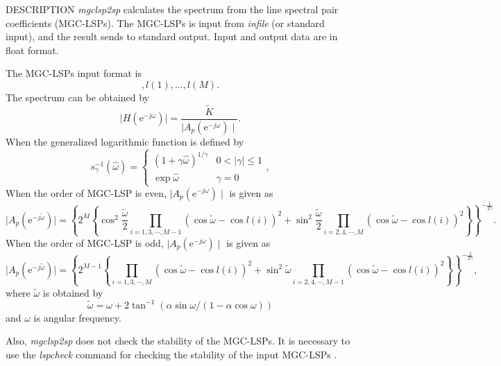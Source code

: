 \begin{synopsis}
\item [mgclsp2sp] [ --a $A$ ] [ --g $G$ ] [ --m $M$ ] [ --l $L$] [ --q $Q$ ] 
 [ --s $S$ ] [ --o $O$] \newline [ --k ] [ --L ] [ {\em infile} ]
\end{synopsis}

\begin{qsection}{DESCRIPTION}
{\em mgclsp2sp} calculates the spectrum from the line spectral pair coefficients (MGC-LSPs).
The MGC-LSPs is input from {\em infile} (or standard input), and the result sends to standard output.
Input and output data are in float format.

The MGC-LSPs input format is
\begin{displaymath}
 [ \tilde{K} ], l(1), \dots, l(M).
\end{displaymath}
The spectrum can be obtained by
\begin{displaymath}
 \mid H(\mathrm{e}^{-j\omega}) \mid = \frac{\tilde{K}}{\mid A_p(\mathrm{e}^{-j\omega}) \mid}.
\end{displaymath}
When the generalized logarithmic function is defined by
\begin{displaymath}
 s_{\gamma}^{-1}(\hat{\omega}) = \left\{
                    \begin{array}{ll}
                     (1 + \gamma \hat{\omega})^{1/\gamma } & 0<|\gamma|\le 1 \\
                     \exp \hat{\omega} & \gamma = 0
                    \end{array}
                   \right. ,
\end{displaymath}
When the order of MGC-LSP is even, $\mid A_p(\mathrm{e}^{-j\omega}) \mid$ is given as
\begin{displaymath}
 \mid A_p(\mathrm{e}^{-j\tilde{\omega}}) \mid =  \left\{ 2^M \left\{ \cos^2 \frac{\tilde{\omega}}{2}\prod_{i=1,3,\cdots,M-1}(\cos \tilde{\omega} - \cos l(i))^2 + \sin^2 \frac{\tilde{\omega}}{2}\prod_{i=2,4,\cdots,M}(\cos \tilde{\omega} - \cos l(i))^2 \right\} \right\}^{-\frac{1}{2\gamma }}.
\end{displaymath}
When the order of MGC-LSP is odd, $\mid A_p(\mathrm{e}^{-j\omega}) \mid$ is given as
\begin{displaymath}
\mid A_p(\mathrm{e}^{-j\tilde{\omega}}) \mid = \left\{ 2^{M-1} \left\{ \prod_{i=1,3,\cdots,M}(\cos \tilde{\omega} - \cos l(i))^2 + \sin^2 \tilde{\omega} \prod_{i=2,4,\cdots,M-1}(\cos \tilde{\omega} - \cos l(i))^2 \right\} \right\}^{-\frac{1}{2\gamma }} ,
\end{displaymath}
where $\tilde{\omega}$ is obtained by
\begin{displaymath}
 \tilde{\omega} = \omega + 2\tan^{-1}(\alpha \sin \omega / (1 - \alpha \cos \omega))
\end{displaymath}
and $\omega$ is angular frequency.

Also, {\em mgclsp2sp} does not check the stability of the MGC-LSPs.
It is necessary to use the {\em lspcheck} command
for checking the stability of the input MGC-LSPs . 
\end{qsection}

